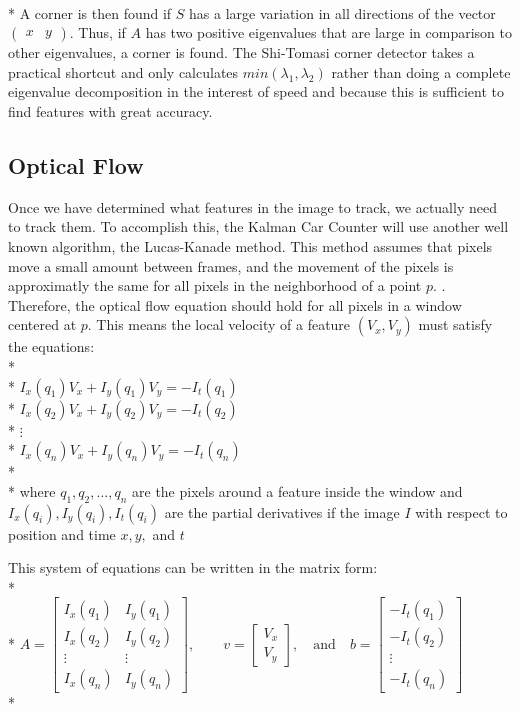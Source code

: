 \documentclass{article} %
\begin{document}
\\*
A corner is then found if $S$ has a large variation in all directions of the vector $\begin{pmatrix} x & y \end{pmatrix}$. Thus, if $A$ has two positive eigenvalues that are large in comparison to other eigenvalues, a corner is found. \cite{tommasini1998making} The Shi-Tomasi corner detector takes a practical shortcut and only calculates $min(\lambda_1, \lambda_2)$ rather than doing a complete eigenvalue decomposition in the interest of speed and because this is sufficient to find features with great accuracy. \cite{Shi94}

\subsection{Optical Flow}
Once we have determined what features in the image to track, we actually need to track them. To accomplish this, the Kalman Car Counter will use another well known algorithm, the Lucas-Kanade method. This method assumes that pixels move a small amount between frames, and the movement of the pixels is approximatly the same for all pixels in the neighborhood of a point $p$. \cite{lucas1981iterative}. Therefore, the optical flow equation should hold for all pixels in a window centered at $p$. This means the local velocity of a feature $(V_x,V_y)$ must satisfy the equations:\\*\\*
$I_x(q_1) V_x + I_y (q_1) V_y = -I_t(q_1)$\\*
$I_x(q_2) V_x + I_y (q_2) V_y = -I_t(q_2)$\\*
$\vdots$\\*
$I_x(q_n) V_x + I_y (q_n) V_y = -I_t(q_n)$\\*\\*
where $q_1,q_2,\dots,q_n$ are the pixels around a feature inside the window and $I_x(q_i),I_y(q_i),I_t(q_i)$ are the partial derivatives if the image $I$ with respect to position and time $x,y,$ and $t$

This system of equations can be written in the matrix form:\\*\\*
$A = \begin{bmatrix}
I_x(q_1) & I_y(q_1) \\[10pt]
I_x(q_2) & I_y(q_2) \\[10pt]
\vdots  & \vdots  \\[10pt]
I_x(q_n) & I_y(q_n) 
\end{bmatrix},
\quad\quad
v = 
\begin{bmatrix}
V_x\\[10pt]
V_y
\end{bmatrix},
\quad \mbox{and}\quad
b = 
\begin{bmatrix}
-I_t(q_1) \\[10pt]
-I_t(q_2) \\[10pt]
\vdots  \\[10pt]
-I_t(q_n)
\end{bmatrix}
$\\*
\end{document}
